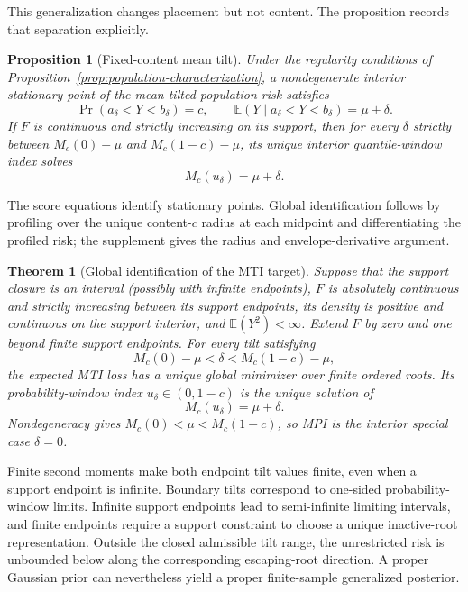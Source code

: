 \documentclass[11pt]{article}
\numberwithin{equation}{section}
\newcommand{\E}{\mathbb{E}}
\newtheorem{proposition}{Proposition}
\newtheorem{theorem}{Theorem}
\begin{document}
This generalization changes placement but not content. The proposition records
that separation explicitly.

\begin{proposition}[Fixed-content mean tilt]
\label{prop:mean-tilt}
Under the regularity conditions of
Proposition~\ref{prop:population-characterization}, a nondegenerate interior
stationary point of the mean-tilted population risk satisfies
\[
\Pr(a_\delta<Y<b_\delta)=c,\qquad
\E(Y\mid a_\delta<Y<b_\delta)=\mu+\delta.
\]
If \(F\) is continuous and strictly increasing on its support, then for every
\(\delta\) strictly between \(M_c(0)-\mu\) and
\(M_c(1-c)-\mu\), its unique interior quantile-window index solves
\[
M_c(u_\delta)=\mu+\delta.
\]
\end{proposition}

The score equations identify stationary points. Global identification follows
by profiling over the unique content-\(c\) radius at each midpoint and
differentiating the profiled risk; the supplement gives the radius and
envelope-derivative argument.

\begin{theorem}[Global identification of the MTI target]
\label{thm:profiled-mean-tilt}
Suppose that the support closure is an interval (possibly with infinite
endpoints), \(F\) is absolutely continuous and strictly increasing between its
support endpoints, its density is positive and continuous on the support
interior, and \(\E(Y^2)<\infty\). Extend \(F\) by zero and one beyond finite
support endpoints. For every tilt satisfying
\[
M_c(0)-\mu<\delta<M_c(1-c)-\mu,
\]
the expected MTI loss has a unique global minimizer over finite ordered
roots. Its probability-window index \(u_\delta\in(0,1-c)\) is the unique
solution of
\[
M_c(u_\delta)=\mu+\delta.
\]
Nondegeneracy gives \(M_c(0)<\mu<M_c(1-c)\), so MPI is the interior
special case \(\delta=0\).
\end{theorem}

Finite second moments make both endpoint tilt values finite, even when a
support endpoint is infinite. Boundary tilts correspond to one-sided
probability-window limits. Infinite support endpoints lead to semi-infinite
limiting intervals, and finite endpoints require a support constraint to choose
a unique inactive-root representation. Outside the closed admissible tilt range,
the unrestricted risk is unbounded below along the corresponding escaping-root
direction. A proper Gaussian prior can nevertheless yield a proper
finite-sample generalized posterior.
\end{document}
